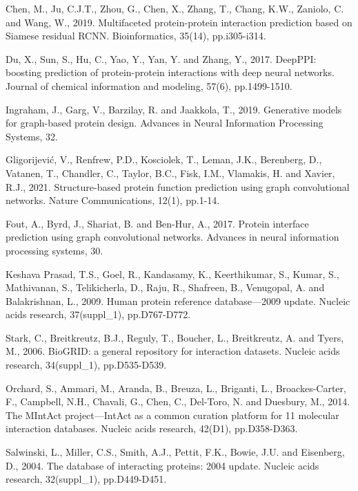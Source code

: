 \documentclass[12pt,a4paper]{article}
\begin{document}
\begin{thebibliography}{00}
 Chen, M., Ju, C.J.T., Zhou, G., Chen, X., Zhang, T., Chang, K.W., Zaniolo, C. and Wang, W., 2019. Multifaceted protein-protein interaction prediction based on Siamese residual RCNN. Bioinformatics, 35(14), pp.i305-i314.

 Du, X., Sun, S., Hu, C., Yao, Y., Yan, Y. and Zhang, Y., 2017. DeepPPI: boosting prediction of protein-protein interactions with deep neural networks. Journal of chemical information and modeling, 57(6), pp.1499-1510.

 Ingraham, J., Garg, V., Barzilay, R. and Jaakkola, T., 2019. Generative models for graph-based protein design. Advances in Neural Information Processing Systems, 32.

 Gligorijević, V., Renfrew, P.D., Kosciolek, T., Leman, J.K., Berenberg, D., Vatanen, T., Chandler, C., Taylor, B.C., Fisk, I.M., Vlamakis, H. and Xavier, R.J., 2021. Structure-based protein function prediction using graph convolutional networks. Nature Communications, 12(1), pp.1-14.

 Fout, A., Byrd, J., Shariat, B. and Ben-Hur, A., 2017. Protein interface prediction using graph convolutional networks. Advances in neural information processing systems, 30.

 Keshava Prasad, T.S., Goel, R., Kandasamy, K., Keerthikumar, S., Kumar, S., Mathivanan, S., Telikicherla, D., Raju, R., Shafreen, B., Venugopal, A. and Balakrishnan, L., 2009. Human protein reference database—2009 update. Nucleic acids research, 37(suppl_1), pp.D767-D772.

 Stark, C., Breitkreutz, B.J., Reguly, T., Boucher, L., Breitkreutz, A. and Tyers, M., 2006. BioGRID: a general repository for interaction datasets. Nucleic acids research, 34(suppl_1), pp.D535-D539.

 Orchard, S., Ammari, M., Aranda, B., Breuza, L., Briganti, L., Broackes-Carter, F., Campbell, N.H., Chavali, G., Chen, C., Del-Toro, N. and Duesbury, M., 2014. The MIntAct project—IntAct as a common curation platform for 11 molecular interaction databases. Nucleic acids research, 42(D1), pp.D358-D363.

 Salwinski, L., Miller, C.S., Smith, A.J., Pettit, F.K., Bowie, J.U. and Eisenberg, D., 2004. The database of interacting proteins: 2004 update. Nucleic acids research, 32(suppl_1), pp.D449-D451.


\end{thebibliography}
\end{document}
